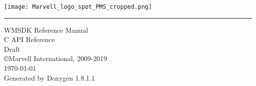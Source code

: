 \documentclass{book}
\newcommand{\TitleHRule}{\rule{\linewidth}{10pt}}
\begin{document}
\SetWatermarkFontSize{3cm}
\hypersetup{pageanchor=false,citecolor=blue}
\begin{titlepage}
\begin{minipage}[t]{\textwidth}
\raggedleft
\texttt{[image: Marvell\_logo\_spot\_PMS\_cropped.png]}
\end{minipage}
\vspace{.5cm}
\TitleHRule
\vspace{3.5cm}
\begin{flushleft}
{\Huge {\color{red} WMSDK Reference Manual}}\\
\vspace{1cm}
{\Large { C API Reference }}\\
\vspace{.75cm}
{{ Draft }}\\
\vspace{4cm}
{\Large \copyright \space Marvell International, 2009-2019}\\
\vspace{1cm}
{\small {\today \space \currenttime}}\\
{\small Generated by Doxygen 1.8.1.1}\\
\end{flushleft}
\end{titlepage}
\clearemptydoublepage
{}
\tableofcontents
\clearemptydoublepage
{}
\hypersetup{pageanchor=true,citecolor=blue}
\end{document}

